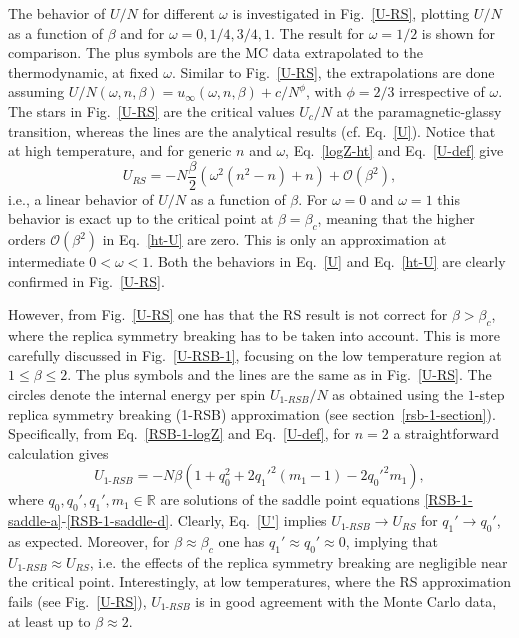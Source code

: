 \documentclass[twocolumn,superscriptaddress,prb,10pt]{revtex4-1}
\begin{document}
The behavior of $U/N$ for different $\omega$ is investigated in Fig.~\ref{U-RS},
plotting $U/N$ as a function of $\beta$ and for $\omega=0,1/4,3/4,1$. The result for $\omega=1/2$ 
is shown for comparison. The plus symbols 
are the MC data extrapolated to the thermodynamic, at fixed $\omega$. Similar to Fig.~\ref{U-RS}, 
the extrapolations are done assuming $U/N(\omega,n,\beta)=u_{\infty}(\omega,n,\beta)+
c/N^{\phi}$, with $\phi=2/3$ irrespective of $\omega$. The stars in Fig.~\ref{U-RS} are 
the critical values $U_c/N$ at the paramagnetic-glassy transition, whereas the lines 
are the analytical results (cf. Eq.~\eqref{U}). Notice that at high temperature, and for 
generic $n$ and $\omega$, Eq.~\eqref{logZ-ht} and Eq.~\eqref{U-def} give  
%
\begin{equation}
U_{RS}= -N\frac{\beta}{2}(\omega^2(n^2-n)+n)+{\mathcal O}(\beta^2), 
\label{ht-U}
\end{equation}
%
i.e., a linear behavior of $U/N$ as a function of $\beta$. For $\omega=0$ and $\omega=1$ 
this behavior is exact up to the critical point at $\beta=\beta_c$, meaning that the higher 
orders ${\mathcal O}(\beta^2)$ in Eq.~\eqref{ht-U} are zero. This is only an approximation 
at intermediate $0<\omega<1$. Both the behaviors in Eq.~\eqref{U} and Eq.~\eqref{ht-U} are 
clearly confirmed in Fig.~\ref{U-RS}. 

However, from Fig.~\ref{U-RS} one has that the RS result is not correct for $\beta>\beta_c$, 
where the replica symmetry breaking has to be taken into account. This is  more carefully 
discussed in Fig.~\ref{U-RSB-1}, focusing on the low temperature region at $1\le\beta\le 2$. 
The plus symbols and the lines are the same as in Fig.~\ref{U-RS}. The circles denote the 
internal energy per spin $U_{1\textrm{-}RSB}/N$ as obtained using the $1$-step replica 
symmetry breaking (1-RSB) approximation (see section~\ref{rsb-1-section}). Specifically, 
from Eq.~\eqref{RSB-1-logZ} and Eq.~\eqref{U-def}, for $n=2$ a straightforward calculation 
gives 
%
\begin{equation}
U_{1\textrm{-}RSB}=-N\beta(1+q_0^2+2q_1'^2(m_1-1)-2q_0'^2m_1), 
\label{U'}
\end{equation}
%
where $q_0,q_0',q_1',m_1\in\mathbb{R}$ are solutions of the saddle point 
equations \eqref{RSB-1-saddle-a}-\eqref{RSB-1-saddle-d}. Clearly, Eq.~\eqref{U'} 
implies $U_{1\textrm{-}RSB}\to U_{RS}$ for $q_1'\to q_0'$, as expected. 
Moreover, for $\beta\approx\beta_c$ one has $q_1'\approx q_0'\approx0$, implying   
that $U_{1\textrm{-}RSB}\approx U_{RS}$, i.e. the effects of the replica symmetry 
breaking are negligible near the critical point. Interestingly, at low temperatures, where the 
RS approximation fails (see Fig.~\ref{U-RS}), $U_{1\textrm{-}RSB}$ 
is in good agreement with the Monte Carlo data, at least up to $\beta\approx 2$.  
\end{document}
